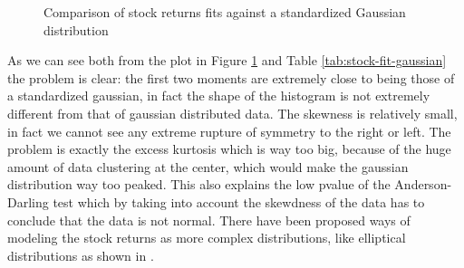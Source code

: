 \begin{table}[htb]
\centering
{}
\caption{Descriptive statics and results of fit of stock returns against a standardized Gaussian distribution.}
\label{tab:stock-fit-gaussian}
\end{table}

\begin{figure}[htb]
\centering

\caption{Comparison of stock returns fits against a standardized Gaussian distribution}
\label{fig:stock-returns-normal}
\end{figure}

As we can see both from the plot in Figure \ref{fig:stock-returns-normal} and Table \ref{tab:stock-fit-gaussian} the problem is clear: the first two moments are extremely close to being those of a standardized gaussian, in fact the shape of the histogram is not extremely different from that of gaussian distributed data. The skewness is relatively small, in fact we cannot see any extreme rupture of symmetry to the right or left. The problem is exactly the excess kurtosis which is way too big, because of the huge amount of data clustering at the center, which would make the gaussian distribution way too peaked. This also explains the low pvalue of the Anderson-Darling test which by taking into account the skewdness of the data has to conclude that the data is not normal. There have been proposed ways of modeling the stock returns as more complex distributions, like elliptical distributions as shown in \cite{risk-parity-hard}.



